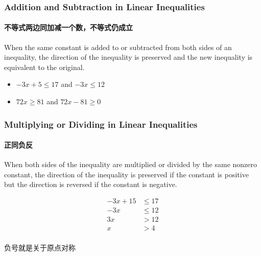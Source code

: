 \documentclass[
	11pt, %
]{beamer}
\begin{document}

\begin{frame}
	\frametitle{Addition and Subtraction in  Linear Inequalities}
	\framesubtitle{不等式两边同加减一个数，不等式仍成立}

	\begin{theorem}[Rule 1]
		When the same constant is added to or subtracted from both sides of an inequality, the direction of the inequality is preserved and the new inequality is equivalent to the original.
	\end{theorem}

	\begin{example}
		\begin{itemize}
			\item   $-3x +5 \leq 17 $ and $-3x \leq 12$
			\item   $72x  \geq 81 $ and $72x  -81 \geq 0 $
		\end{itemize}
	\end{example}

\end{frame}




\begin{frame}
	\frametitle{Multiplying or Dividing in  Linear Inequalities}
	\framesubtitle{正同负反}
	\begin{theorem}[Rule 2]
		When both sides of the inequality are multiplied or divided by the same nonzero constant, the direction of the inequality is \alert{preserved if the constant is positive} but the direction is \alert{reversed if the constant is negative}.
	\end{theorem}

	\begin{example}
	  \begin{equation*}
	  	\begin{split}
	  		-3x + 15 &\leq 17\\
	  		-3x &\leq 12 \\
	  		3x &>12 \\
	  		x &> 4\\
	  	\end{split}
	  \end{equation*}
	\end{example}
\alert{负号就是关于原点对称}
\end{frame}

\end{document}
